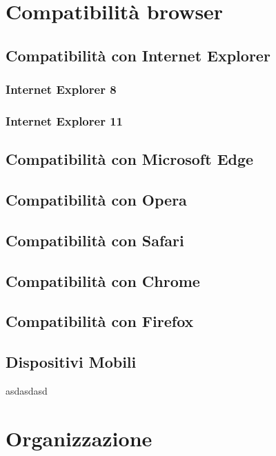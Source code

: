 \documentclass[10pt, a4paper]{article}
\begin{document}
\section{Compatibilità browser}

\subsection{Compatibilità con Internet Explorer}

\subsubsection{Internet Explorer 8}

\subsubsection{Internet Explorer 11}

\subsection{Compatibilità con Microsoft Edge}

\subsection{Compatibilità con Opera}

\subsection{Compatibilità con Safari}

\subsection{Compatibilità con Chrome}

\subsection{Compatibilità con Firefox}

\subsection{Dispositivi Mobili}

asdasdasd
\section{Organizzazione}
\end{document}
